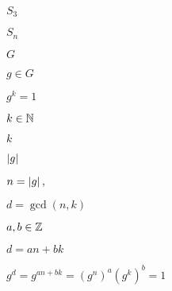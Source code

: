 \documentclass[10pt]{book}
\begin{document}
\begin{mdSnippets}
\begin{mdInlineSnippet}[fb6b03756fea2039f2e6b6c27b7a00cc]%
$S_3$\end{mdInlineSnippet}%
\begin{mdInlineSnippet}[88e99f0b764d313c50a5f4fdd8a7947e]%
$S_n$\end{mdInlineSnippet}%
\begin{mdInlineSnippet}[dfcf28d0734569a6a693bc8194de62bf]%
$G$\end{mdInlineSnippet}%
\begin{mdInlineSnippet}[c9742018c5575f06f59ce542b29ad79d]%
$g \in G$\end{mdInlineSnippet}%
\begin{mdInlineSnippet}[194623f084592b5ff847f9d859801c6a]%
$g^k = 1$\end{mdInlineSnippet}%
\begin{mdInlineSnippet}[79179570fc2a8bc07d8f0ee1a9c32747]%
$k \in \mathbb{N}$\end{mdInlineSnippet}%
\begin{mdInlineSnippet}[8ce4b16b22b58894aa86c421e8759df3]%
$k$\end{mdInlineSnippet}%
\begin{mdInlineSnippet}[15866c724739987a8b7cc06e8ce0f7fa]%
$\left\vert g\right\vert$\end{mdInlineSnippet}%
\begin{mdInlineSnippet}[099e4860c31b545d5d7f7ddd9a57d8db]%
$n = \left\vert g\right\vert,$\end{mdInlineSnippet}%
\begin{mdInlineSnippet}[a0b067cef7451bb579a5591f850f029d]%
$d = \gcd(n,k)$\end{mdInlineSnippet}%
\begin{mdInlineSnippet}[75dc3a809542e83b70f842fd5b54b979]%
$a,b \in \mathbb{Z}$\end{mdInlineSnippet}%
\begin{mdInlineSnippet}[513617aaf7c4c3f680d6154ff9912272]%
$d = an+bk$\end{mdInlineSnippet}%
\begin{mdInlineSnippet}%
$g^d = g^{an+bk} = (g^n)^a (g^k)^b = 1$\end{mdInlineSnippet}%

\end{mdSnippets}
\end{document}
